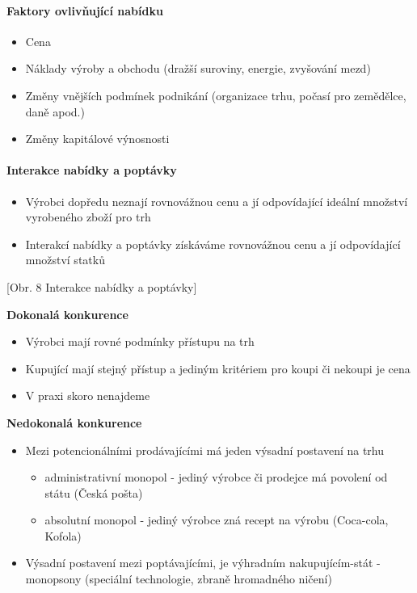 \paragraph*{Faktory ovlivňující nabídku}
\begin{itemize}
    \item Cena
    \item Náklady výroby a obchodu (dražší suroviny, energie, zvyšování mezd)
    \item Změny vnějších podmínek podnikání (organizace trhu, počasí pro zemědělce, daně apod.)
    \item Změny kapitálové výnosnosti
\end{itemize}

\paragraph*{Interakce nabídky a poptávky}
\begin{itemize}
    \item Výrobci dopředu neznají rovnovážnou cenu a jí odpovídající ideální množství vyrobeného zboží pro trh
    \item Interakcí nabídky a poptávky získáváme rovnovážnou cenu a jí odpovídající množství statků
\end{itemize}

[Obr. 8 Interakce nabídky a poptávky]

\textbf{Dokonalá konkurence}
\begin{itemize}
    \item Výrobci mají rovné podmínky přístupu na trh
    \item Kupující mají stejný přístup a jediným kritériem pro koupi či nekoupi je cena
    \item V praxi skoro nenajdeme
\end{itemize}

\textbf{Nedokonalá konkurence}
\begin{itemize}
    \item Mezi potencionálními prodávajícími má jeden výsadní postavení na trhu
    \begin{itemize}
        \item administrativní monopol - jediný výrobce či prodejce má povolení od státu (Česká pošta)
        \item absolutní monopol - jediný výrobce zná recept na výrobu (Coca-cola, Kofola)
    \end{itemize}
    \item Výsadní postavení mezi poptávajícími, je výhradním nakupujícím-stát - monopsony (speciální technologie, zbraně hromadného ničení)
\end{itemize}

